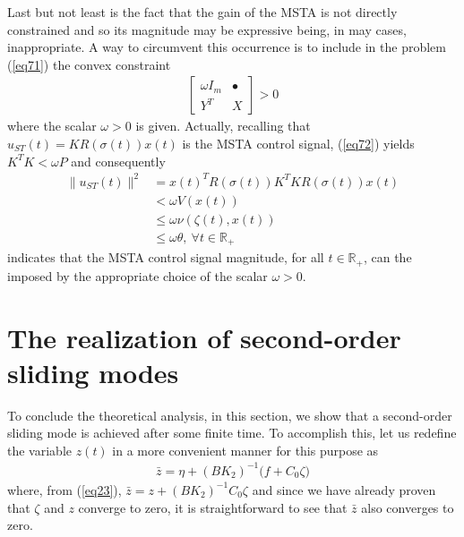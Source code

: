 \documentclass[twocolumn]{autarc_LH}
\newcommand{\Rf}{{\mathbb R}}
\begin{document}
Last but not least is the fact that the gain of the MSTA is not directly constrained and so its magnitude may be expressive being, in may cases, inappropriate. A way to circumvent this occurrence is to include in the problem (\ref{eq71}) the convex constraint 
\begin{align}
		\label{eq72}  \left [ \begin{array}{cc} \omega I_m & \bullet \\ Y^T & X \end{array} \right ]>0
\end{align}
where the scalar $\omega>0$ is given. Actually, recalling that $u_{ST}(t) = K R(\sigma(t))x(t)$ is the MSTA control signal, (\ref{eq72}) yields $K^TK < \omega P$ and consequently 
\begin{align}
		\label{eq73}  \|u_{ST}(t)\|^2 & = x(t)^T R(\sigma(t))K^TKR(\sigma(t))x(t) \nonumber \\
        & < \omega V(x(t))  \nonumber \\
        &  \leq \omega \nu(\zeta(t),x(t)) \nonumber \\
        & \leq \omega \theta,~\forall t \in \Rf_+
\end{align}
indicates that the MSTA control signal magnitude, for all $t \in \Rf_+$, can the imposed by the appropriate choice of the scalar $\omega>0$.  

\section{
\label{second_order_SM}
The realization of second-order sliding modes
}

To conclude the theoretical analysis, in this section, we show that a second-order sliding mode is achieved after some finite time. To accomplish this, let us redefine the variable $z(t)$ in a more convenient manner for this purpose as
\begin{align} \label{eq_newz}
\bar z = \eta +  (B K_2)^{-1} \bigg( f +  C_{0} \zeta \bigg )
\end{align}
where, from (\ref{eq23}), $\bar z = z +  (B K_2)^{-1} C_{0} \zeta $ and since we have already proven that $\zeta$ and $z$ converge to zero, it is straightforward to see that $\bar z$ also converges to zero. 
\end{document}
